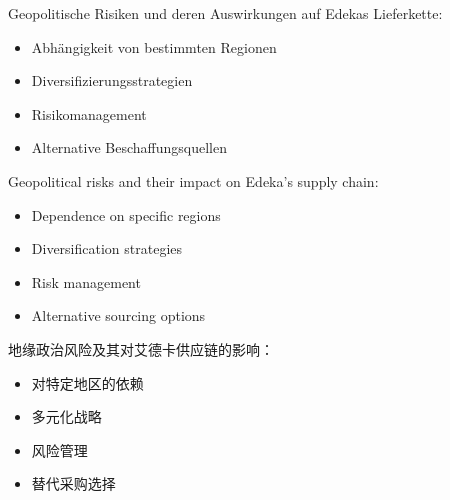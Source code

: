 \begin{otherlanguage}{ngerman}
Geopolitische Risiken und deren Auswirkungen auf Edekas Lieferkette:
\begin{itemize}
    \item Abhängigkeit von bestimmten Regionen
    \item Diversifizierungsstrategien
    \item Risikomanagement
    \item Alternative Beschaffungsquellen
\end{itemize}
\end{otherlanguage}

Geopolitical risks and their impact on Edeka's supply chain:
\begin{itemize}
    \item Dependence on specific regions
    \item Diversification strategies
    \item Risk management
    \item Alternative sourcing options
\end{itemize}

地缘政治风险及其对艾德卡供应链的影响：
\begin{itemize}
    \item 对特定地区的依赖
    \item 多元化战略
    \item 风险管理
    \item 替代采购选择
\end{itemize}
